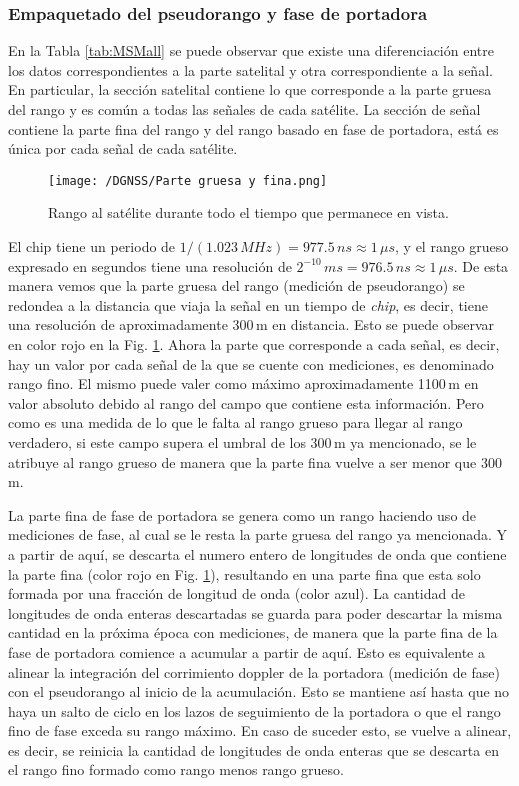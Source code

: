 \documentclass[a4paper,12pt,oneside,onecolumn,final,openright]{book}%
\begin{document}
\subsubsection{Empaquetado del pseudorango y fase de portadora}\label{sec:rrng_frng}
	En la Tabla \ref{tab:MSMall} se puede observar que existe una diferenciación entre los datos correspondientes a la parte satelital y otra correspondiente a la señal. En particular, la sección satelital contiene lo que corresponde a la parte gruesa del rango y es común a todas las señales de cada satélite. La sección de señal contiene la parte fina del rango y del rango basado en fase de portadora, está es única por cada señal de cada satélite. 
	
\begin{figure}
    \centering
    \texttt{[image: /DGNSS/Parte gruesa y fina.png]}
    \caption{Rango al satélite durante todo el tiempo que permanece en vista.}
    \label{fig:rrng_frng}
\end{figure}
	
	El chip tiene un periodo de $1/(1.023\,MHz) = 977.5\,ns \approx 1\,\mu s$, y el rango grueso expresado en segundos tiene una resolución de $2^{-10}\,ms = 976.5\,ns \approx 1\, \mu s$. De esta manera vemos que la parte gruesa del rango (medición de pseudorango) se redondea a la distancia que viaja la señal en un tiempo de \textit{chip}, es decir, tiene una resolución de aproximadamente 300\,m en distancia. Esto se puede observar en color rojo en la Fig. \ref{fig:rrng_frng}. Ahora la parte que corresponde a cada señal, es decir, hay un valor por cada señal de la que se cuente con mediciones, es denominado rango fino. El mismo puede valer como máximo aproximadamente 1100\,m en valor absoluto debido al rango del campo que contiene esta información. Pero como es una medida de lo que le falta al rango grueso para llegar al rango verdadero, si este campo supera el umbral de los 300\,m ya mencionado, se le atribuye al rango grueso de manera que la parte fina vuelve a ser menor que 300\,m.
	
	La parte fina de fase de portadora se genera como un rango haciendo uso de mediciones de fase, al cual se le resta la parte gruesa del rango ya mencionada. Y a partir de aquí, se descarta el numero entero de longitudes de onda que contiene la parte fina (color rojo en Fig. \ref{fig:rrng_frng}), resultando en una parte fina que esta solo formada por una fracción de longitud de onda (color azul). La cantidad de longitudes de onda enteras descartadas se guarda para poder descartar la misma cantidad en la próxima época con mediciones, de manera que la parte fina de la fase de portadora comience a acumular a partir de aquí. Esto es equivalente a alinear la integración del corrimiento doppler de la portadora (medición de fase) con el pseudorango al inicio de la acumulación. Esto se mantiene así hasta que no haya un salto de ciclo en los lazos de seguimiento de la portadora o que el rango fino de fase exceda su rango máximo. En caso de suceder esto, se vuelve a alinear, es decir, se reinicia la cantidad de longitudes de onda enteras que se descarta en el rango fino formado como rango menos rango grueso. 
	
\end{document}
